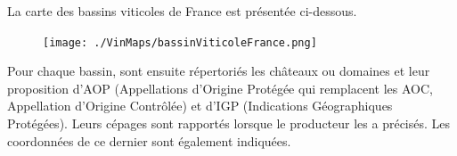 La carte des bassins viticoles de France est présentée ci-dessous.
\begin{figure}[!t]
\texttt{[image: ./VinMaps/bassinViticoleFrance.png]}
\end{figure}
\newpage
Pour chaque bassin, sont ensuite répertoriés les châteaux ou domaines et leur proposition d’AOP (Appellations d’Origine Protégée qui remplacent les AOC, Appellation d’Origine Contrôlée) et d’IGP (Indications Géographiques Protégées). Leurs cépages sont rapportés lorsque le producteur les a précisés. Les coordonnées de ce dernier sont également indiquées.     
